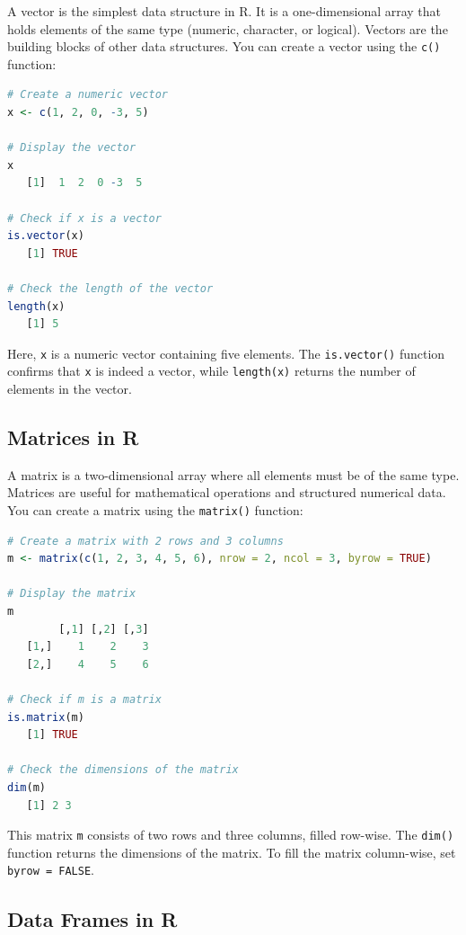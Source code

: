 \documentclass[
  11pt,
]{book}
\newcommand{\passthrough}[1]{#1}
\theoremstyle{definition}
\theoremstyle{definition}
\theoremstyle{definition}
\theoremstyle{definition}
\theoremstyle{remark}
\begin{document}
A vector is the simplest data structure in R. It is a one-dimensional array that holds elements of the same type (numeric, character, or logical). Vectors are the building blocks of other data structures. You can create a vector using the \passthrough{\lstinline!c()!} function:

\begin{lstlisting}[language=R]
# Create a numeric vector
x <- c(1, 2, 0, -3, 5)

# Display the vector
x
   [1]  1  2  0 -3  5

# Check if x is a vector
is.vector(x)
   [1] TRUE

# Check the length of the vector
length(x)
   [1] 5
\end{lstlisting}

Here, \passthrough{\lstinline!x!} is a numeric vector containing five elements. The \passthrough{\lstinline!is.vector()!} function confirms that \passthrough{\lstinline!x!} is indeed a vector, while \passthrough{\lstinline!length(x)!} returns the number of elements in the vector.

\subsection*{Matrices in R}\label{matrices-in-r}


A matrix is a two-dimensional array where all elements must be of the same type. Matrices are useful for mathematical operations and structured numerical data. You can create a matrix using the \passthrough{\lstinline!matrix()!} function:

\begin{lstlisting}[language=R]
# Create a matrix with 2 rows and 3 columns
m <- matrix(c(1, 2, 3, 4, 5, 6), nrow = 2, ncol = 3, byrow = TRUE)

# Display the matrix
m
        [,1] [,2] [,3]
   [1,]    1    2    3
   [2,]    4    5    6

# Check if m is a matrix
is.matrix(m)
   [1] TRUE

# Check the dimensions of the matrix
dim(m)
   [1] 2 3
\end{lstlisting}

This matrix \passthrough{\lstinline!m!} consists of two rows and three columns, filled row-wise. The \passthrough{\lstinline!dim()!} function returns the dimensions of the matrix. To fill the matrix column-wise, set \passthrough{\lstinline!byrow = FALSE!}.

\subsection*{Data Frames in R}\label{data-frames-in-r}
\end{document}
